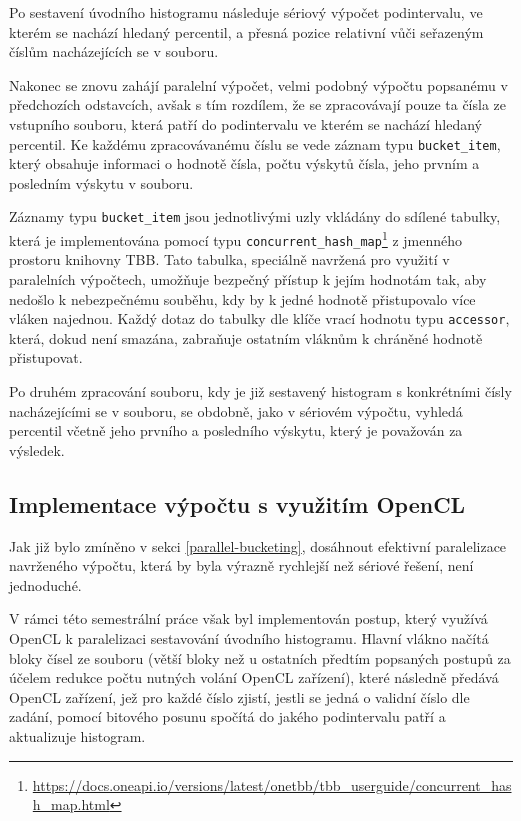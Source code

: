 \documentclass[12pt, a4paper]{article}
\begin{document}
Po sestavení úvodního histogramu následuje sériový výpočet podintervalu, ve kterém se nachází hledaný percentil, a přesná pozice relativní vůči seřazeným číslům nacházejících se v souboru.

Nakonec se znovu zahájí paralelní výpočet, velmi podobný výpočtu popsanému v předchozích odstavcích, avšak s tím rozdílem, že se zpracovávají pouze ta čísla ze vstupního souboru, která patří do podintervalu ve kterém se nachází hledaný percentil.
Ke každému zpracovávanému číslu se vede záznam typu \texttt{bucket\_item}, který obsahuje informaci o hodnotě čísla, počtu výskytů čísla, jeho prvním a posledním výskytu v souboru.

Záznamy typu \texttt{bucket\_item} jsou jednotlivými uzly vkládány do sdílené tabulky, která je implementována pomocí typu \texttt{concurrent\_hash\_map}\footnote{\url{https://docs.oneapi.io/versions/latest/onetbb/tbb_userguide/concurrent_hash_map.html}} z jmenného prostoru knihovny TBB.
Tato tabulka, speciálně navržená pro využití v paralelních výpočtech, umožňuje bezpečný přístup k jejím hodnotám tak, aby nedošlo k nebezpečnému souběhu, kdy by k jedné hodnotě přistupovalo více vláken najednou.
Každý dotaz do tabulky dle klíče vrací hodnotu typu \texttt{accessor}, která, dokud není smazána, zabraňuje ostatním vláknům k chráněné hodnotě přistupovat.

Po druhém zpracování souboru, kdy je již sestavený histogram s konkrétními čísly nacházejícími se v souboru, se obdobně, jako v sériovém výpočtu, vyhledá percentil včetně jeho prvního a posledního výskytu, který je považován za výsledek.

\subsection{Implementace výpočtu s využitím OpenCL}
Jak již bylo zmíněno v sekci \ref{parallel-bucketing}, dosáhnout efektivní paralelizace navrženého výpočtu, která by byla výrazně rychlejší než sériové řešení, není jednoduché.

V rámci této semestrální práce však byl implementován postup, který využívá OpenCL k paralelizaci sestavování úvodního histogramu.
Hlavní vlákno načítá bloky čísel ze souboru (větší bloky než u ostatních předtím popsaných postupů za účelem redukce počtu nutných volání OpenCL zařízení),  které následně předává OpenCL zařízení, jež pro každé číslo zjistí, jestli se jedná o validní číslo dle zadání, pomocí bitového posunu spočítá do jakého podintervalu patří a aktualizuje histogram. 
\end{document}
